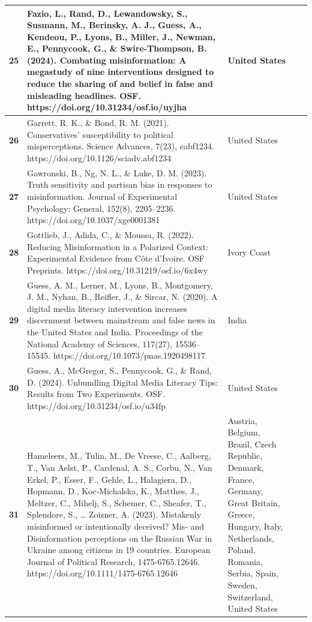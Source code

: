 \documentclass[
  doc,floatsintext]{apa6}
\begin{document}
\begin{longtable}[t]{>{}r||>{\raggedright\arraybackslash}p{20em}|>{\raggedright\arraybackslash}p{7em}|>{\raggedleft\arraybackslash}p{5em}|>{\raggedleft\arraybackslash}p{5em}}
\hline
\textbf{25} & Fazio, L., Rand, D., Lewandowsky, S., Susmann, M., Berinsky, A. J., Guess, A., Kendeou, P., Lyons, B., Miller, J., Newman, E., Pennycook, G., \& Swire-Thompson, B. (2024). Combating misinformation: A megastudy of nine interventions designed to reduce the sharing of and belief in false and misleading headlines. OSF. https://doi.org/10.31234/osf.io/uyjha & United States & 2 & 1617\\
\hline
\textbf{26} & Garrett, R. K., \& Bond, R. M. (2021). Conservatives’ susceptibility to political misperceptions. Science Advances, 7(23), eabf1234. https://doi.org/10.1126/sciadv.abf1234 & United States & 47 & 1204\\
\hline
\textbf{27} & Gawronski, B., Ng, N. L., \& Luke, D. M. (2023). Truth sensitivity and partisan bias in responses to misinformation. Journal of Experimental Psychology: General, 152(8), 2205–2236. https://doi.org/10.1037/xge0001381 & United States & 4 & 481\\
\hline
\textbf{28} & Gottlieb, J., Adida, C., \& Moussa, R. (2022). Reducing Misinformation in a Polarized Context: Experimental Evidence from Côte d’Ivoire. OSF Preprints. https://doi.org/10.31219/osf.io/6x4wy & Ivory Coast & 2 & 1160\\
\hline
\textbf{29} & Guess, A. M., Lerner, M., Lyons, B., Montgomery, J. M., Nyhan, B., Reifler, J., \& Sircar, N. (2020). A digital media literacy intervention increases discernment between mainstream and false news in the United States and India. Proceedings of the National Academy of Sciences, 117(27), 15536–15545. https://doi.org/10.1073/pnas.1920498117 & India & 4 & 3508\\
\hline
\textbf{30} & Guess, A., McGregor, S., Pennycook, G., \& Rand, D. (2024). Unbundling Digital Media Literacy Tips: Results from Two Experiments. OSF. https://doi.org/10.31234/osf.io/u34fp & United States & 9 & 1088\\
\hline
\textbf{31} & Hameleers, M., Tulin, M., De Vreese, C., Aalberg, T., Van Aelst, P., Cardenal, A. S., Corbu, N., Van Erkel, P., Esser, F., Gehle, L., Halagiera, D., Hopmann, D., Koc‐Michalska, K., Matthes, J., Meltzer, C., Mihelj, S., Schemer, C., Sheafer, T., Splendore, S., … Zoizner, A. (2023). Mistakenly misinformed or intentionally deceived? Mis‐ and Disinformation perceptions on the Russian War in Ukraine among citizens in 19 countries. European Journal of Political Research, 1475-6765.12646. https://doi.org/10.1111/1475-6765.12646 & Austria, Belgium, Brazil, Czech Republic, Denmark, France, Germany, Great Britain, Greece, Hungary, Italy, Netherlands, Poland, Romania, Serbia, Spain, Sweden, Switzerland, United States & 19 & 19037\\

\end{longtable}
\end{document}
